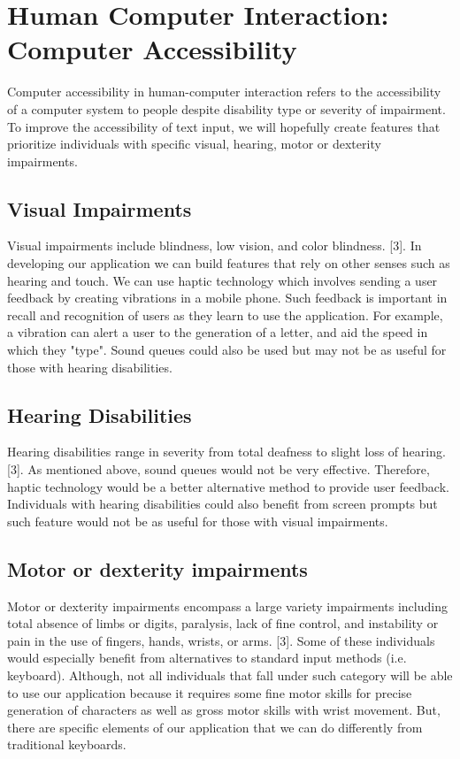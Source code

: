 \documentclass[onecolumn, draftclsnofoot,10pt, journal, letterpaper]{IEEEtran}
\begin{document}
\section{Human Computer Interaction: Computer Accessibility}
Computer accessibility in human-computer interaction refers to the accessibility of a computer system to people despite disability type or severity of impairment. To improve the accessibility of text input, we will hopefully create features that prioritize individuals with specific visual, hearing, motor or dexterity impairments.
\subsection{Visual Impairments}
Visual impairments include blindness, low vision, and color blindness. [3]. In developing our application we can build features that rely on other senses such as hearing and touch. We can use haptic technology which involves sending a user feedback by creating vibrations in a mobile phone. Such feedback is important in recall and recognition of users as they learn to use the application. For example, a vibration can alert a user to the generation of a letter, and aid the speed in which they "type". Sound queues could also be used but may not be as useful for those with hearing disabilities. 
\subsection{Hearing Disabilities}
Hearing disabilities range in severity from total deafness to slight loss of hearing. [3]. As mentioned above, sound queues would not be very effective. Therefore, haptic technology would be a better alternative method to provide user feedback. Individuals with hearing disabilities could also benefit from screen prompts but such feature would not be as useful for those with visual impairments. 
\subsection{Motor or dexterity impairments}
Motor or dexterity impairments encompass a large variety impairments including total absence of limbs or digits, paralysis, lack of fine control, and instability or pain in the use of fingers, hands, wrists, or arms. [3]. Some of these individuals would especially benefit from alternatives to standard input methods (i.e. keyboard). Although, not all individuals that fall under such category will be able to use our application because it requires some fine motor skills for precise generation of characters as well as gross motor skills with wrist movement. But, there are specific elements of our application that we can do differently from traditional keyboards. 
\end{document}
